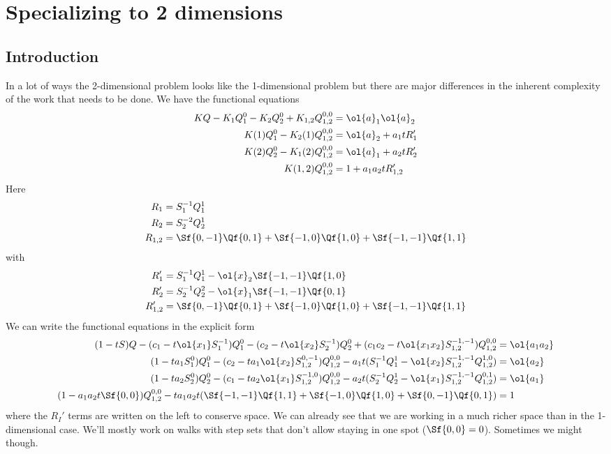 
\chapter{Specializing to 2 dimensions}
\section{Introduction}
In a lot of ways the 2-dimensional problem looks like the 1-dimensional problem but there are major differences in the inherent complexity of the work that needs to be done. We have the functional equations
\begin{align*}
KQ - K_1Q_1^0-K_2Q_2^0 + K_{1,2} Q_{1,2}^{0,0} &= \ol{a}_1\ol{a}_2\\
K(1)Q_1^0 - K_2(1)Q_{1,2}^{0,0} &= \ol{a}_2 + a_1 t R_1'\\
K(2)Q_2^0 - K_1(2)Q_{1,2}^{0,0}&= \ol{a}_1 + a_2 t R_2'\\
K(1,2) Q_{1,2}^{0,0}&= 1 + a_1 a_2t R_{1,2}'
\end{align*}
Here
\begin{align*}
	R_1 &= S_1^{-1}Q_1^1\\
	R_2 &= S_2^{-2}Q_2^1\\
	R_{1,2} & = \Sf{0,-1}\Qf{0,1}+\Sf{-1,0}\Qf{1,0}+\Sf{-1,-1}\Qf{1,1}
\end{align*}
with
\begin{align*}
	R_1' &= S_1^{-1}Q_1^1 - \ol{x}_2\Sf{-1,-1}\Qf{1,0}\\
	R_2' &= S_2^{-1}Q_2^2 - \ol{x}_1\Sf{-1,-1}\Qf{0,1}\\
	R_{1,2}' & = \Sf{0,-1}\Qf{0,1}+\Sf{-1,0}\Qf{1,0}+\Sf{-1,-1}\Qf{1,1}
\end{align*}
We can write the functional equations in the explicit form
\begin{align}
(1-tS)Q - (c_1-t\ol{x_1}S_1^{-1}) Q_1^0- (c_2-t\ol{x_2}S_2^{-1}) Q_2^0+ (c_1c_2-t\ol{x_1x_2}S_{1,2}^{-1,-1})Q_{1,2}^{0,0}  &= \ol{a_1a_2}\\
(1-ta_1 S_1^0)Q_1^0 - (c_2-ta_1\ol{x_2}S_{1,2}^{0,-1})Q_{1,2}^{0,0} - a_1 t(S_1^{-1}Q_1^1-\ol{x_2}S_{1,2}^{-1,-1}Q_{1,2}^{1,0}) &=\ol{a_2}\\
(1-ta_2 S_2^0)Q_2^0 - (c_1-ta_2\ol{x_1}S_{1,2}^{-1,0})Q_{1,2}^{0,0} -a_2t(S_2^{-1}Q_2^1-\ol{x_1}S_{1,2}^{-1,-1}Q_{1,2}^{0,1}) &=\ol{a_1}\\
(1-a_1 a_2 t \Sf{0,0})Q_{1,2}^{0,0} - ta_1a_2t(\Sf{-1,-1}\Qf{1,1}+\Sf{-1,0}\Qf{1,0}+\Sf{0,-1}\Qf{0,1})&= 1
\end{align}
where the $R_I'$ terms are written on the left to conserve space. We can already see that we are working in a much richer space than in the 1-dimensional case. We'll mostly work on walks with step sets that don't allow staying in one spot ($\Sf{0,0} = 0$). Sometimes we might though.

